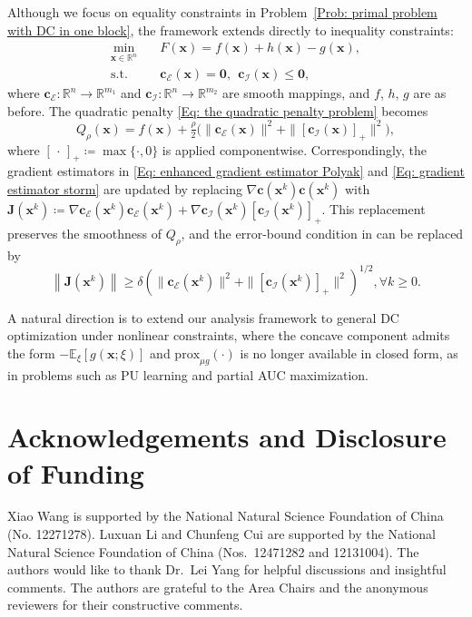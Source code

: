 \documentclass{article}
\theoremstyle{plain}
\theoremstyle{definition}
\theoremstyle{remark}
\newcommand{\zero}{\bm{0}}
\newcommand{\RR}{\mathbb{R}}
\newcommand{\EE}{\mathbb{E}}
\newcommand{\prox}{\mathrm{prox}}
\newcommand{\bx}{\bm{x}}
\newcommand{\bc}{\bm{c}}
\newcommand{\calI}{\mathcal{I}}
\newcommand{\calE}{\mathcal{E}}
\numberwithin{equation}{section}
\begin{document}
Although we focus on equality constraints in Problem~\eqref{Prob: primal problem with DC in one block}, the framework extends directly to inequality constraints:
\begin{equation*}
\begin{aligned}
   \min_{\bx \in \RR^n} \quad & F(\bx) = f(\bx) + h(\bx) - g(\bx), \\
   \text{s.t.} \quad & \bc_{\calE}(\bx) = \zero, \ \ \bc_{\calI}(\bx) \le \zero,
\end{aligned}
\end{equation*}
where $\bc_{\calE}: \RR^n \to \RR^{m_1}$ and $\bc_{\calI}: \RR^n \to \RR^{m_2}$ are smooth mappings, and $f$, $h$, $g$ are as before. The quadratic penalty \eqref{Eq: the quadratic penalty problem} becomes
\begin{equation*}
Q_{\rho}(\bx) = f(\bx) + \tfrac{\rho}{2}\bigl(\|\bc_{\calE}(\bx)\|^2 + \|[\bc_{\calI}(\bx)]_+\|^2\bigr),
\end{equation*}
where $[\,\cdot\,]_+ \coloneqq \max\{\cdot,0\}$ is applied componentwise. Correspondingly, the gradient estimators in \eqref{Eq: enhanced gradient estimator Polyak} and \eqref{Eq: gradient estimator storm} are updated by replacing $\nabla \bc(\bx^k)\bc(\bx^k)$ with $\bm{J}(\bx^k) \coloneqq \nabla \bc_{\calE}(\bx^k)\bc_{\calE}(\bx^k) + \nabla \bc_{\calI}(\bx^k)[\bc_{\calI}(\bx^k)]_+$. This replacement preserves the smoothness of $Q_{\rho}$, and the error-bound condition in
 can be replaced by
\[
\left\| \bm{J}(\bx^k)\right\|
\ge
\delta
\left(
\|\bc_{\calE}(\bx^k)\|^2
+
\|[\bc_{\calI}(\bx^k)]_+\|^2
\right)^{1/2}, \forall k\ge 0.
\]

A natural direction is to extend our analysis framework to general DC optimization under nonlinear constraints, where the concave component admits the form $-\EE_{\xi}\!\left[g(\bx;\xi)\right]$ and $\prox_{\mu g}(\cdot)$ is no longer available in closed form, as in problems such as PU learning and partial AUC maximization.
\section*{Acknowledgements and Disclosure of Funding}
Xiao Wang is supported by the National Natural Science Foundation of China (No. 12271278). Luxuan Li and Chunfeng Cui are supported by the National Natural Science Foundation of China (Nos.~12471282 and 12131004). The authors would like to thank Dr.\ Lei Yang for helpful discussions and insightful comments. The authors are grateful to the Area Chairs and the anonymous reviewers for their constructive comments.
\end{document}

